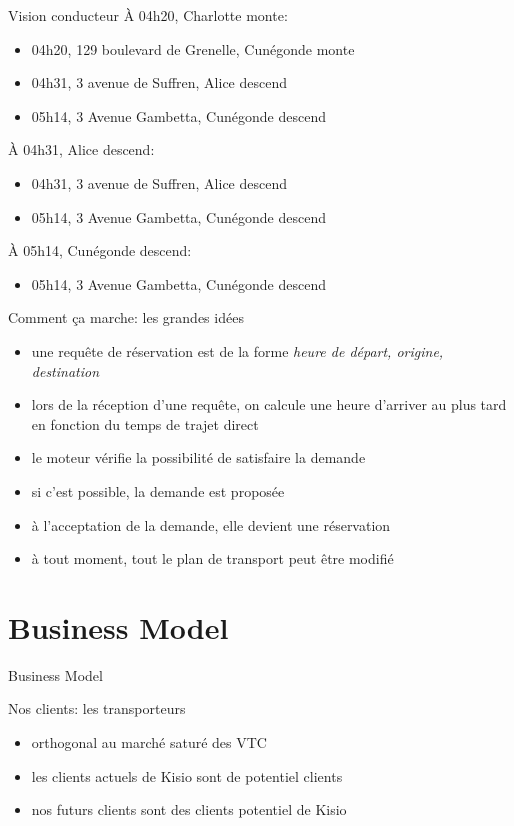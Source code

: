 \documentclass[table]{beamer}
\begin{document}
\begin{frame}[allowframebreaks]{Vision conducteur}
  À 04h20, Charlotte monte:
  \begin{itemize}
  \item<42> 04h20, 129 boulevard de Grenelle, Cunégonde monte
  \item 04h31, 3 avenue de Suffren, Alice descend
  \item 05h14, 3 Avenue Gambetta, Cunégonde descend
  \end{itemize}\framebreak

  À 04h31, Alice descend:
  \begin{itemize}
  \item<42> 04h31, 3 avenue de Suffren, Alice descend
  \item 05h14, 3 Avenue Gambetta, Cunégonde descend
  \end{itemize}\framebreak

  À 05h14, Cunégonde descend:
  \begin{itemize}
  \item<42> 05h14, 3 Avenue Gambetta, Cunégonde descend
  \end{itemize}
\end{frame}

\begin{frame}{Comment ça marche: les grandes idées}
  \begin{itemize}
  \item une requête de réservation est de la forme \emph{heure de
      départ, origine, destination}
  \item lors de la réception d'une requête, on calcule une heure
    d'arriver au plus tard en fonction du temps de trajet direct
  \item le moteur vérifie la possibilité de satisfaire la demande
  \item si c'est possible, la demande est proposée
  \item à l'acceptation de la demande, elle devient une réservation
  \item à tout moment, tout le plan de transport peut être modifié
  \end{itemize}
\end{frame}

\section{Business Model}

\begin{frame}{Business Model}

  Nos clients: les transporteurs
  \begin{itemize}
  \item orthogonal au marché saturé des VTC
  \item les clients actuels de Kisio sont de potentiel clients
  \item nos futurs clients sont des clients potentiel de Kisio
  \end{itemize}
\end{frame}
\end{document}
